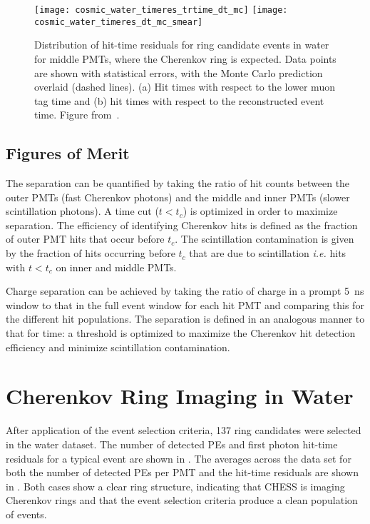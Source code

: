 \begin{figure}
	\centering
	\texttt{[image: cosmic\_water\_timeres\_trtime\_dt\_mc]}
	\texttt{[image: cosmic\_water\_timeres\_dt\_mc\_smear]}
	\caption{Distribution of hit-time residuals for ring candidate events in water for middle PMTs, where the Cherenkov ring is expected. Data points are shown with statistical errors, with the Monte Carlo prediction overlaid (dashed lines). 
	(a) Hit times with respect to the lower muon tag time and (b) hit times with respect to the reconstructed event time.
	Figure from~\cite{chess_nim}.}
	\label{f:smear}
\end{figure}

\subsection{Figures of Merit}

The separation can be quantified by taking the ratio of hit counts between the outer PMTs (fast Cherenkov photons) and the middle and inner PMTs (slower scintillation photons).  
A time cut ($t < t_c$) is optimized in order to maximize separation.  
The efficiency of identifying Cherenkov hits is defined as the fraction of outer PMT hits that occur before $t_c$.  
The scintillation contamination  is given by the fraction of hits occurring before $t_c$ that are due to scintillation {\it i.e.}  hits with $t < t_c$ on inner and middle PMTs. 

Charge separation can be achieved by taking the ratio of charge in a prompt 5~ns window to that in the full event window for each hit PMT and comparing this for the different hit populations.  
The separation is defined in an analogous manner to that for time: a threshold is optimized to maximize the Cherenkov hit detection efficiency and minimize scintillation contamination.  

\clearpage

\section{Cherenkov Ring Imaging in Water}

\label{sec:water}

After application of the event selection criteria, 137 ring candidates were selected in the water dataset.
The number of detected PEs and first photon hit-time residuals for a typical event are shown in . 
The averages across the data set for both the number of detected PEs per PMT and the hit-time residuals are shown in .
Both cases show a clear ring structure, indicating that CHESS is imaging Cherenkov rings and that the event selection criteria produce a clean population of events. 


